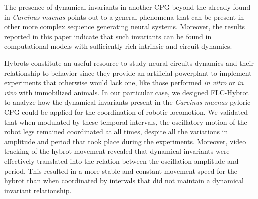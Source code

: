 
The presence of dynamical invariants in another CPG beyond the already found in \textit{Carcinus maenas} \cite{elices_robust_2019} points out to a general phenomena that can be present in other more complex sequence generating neural systems. Moreover, the results reported in this paper indicate that such invariants can be found in computational models with sufficiently rich intrinsic and circuit dynamics.







Hybrots constitute an useful resource to study neural circuits dynamics and their relationship to behavior since they provide an artificial powerplant to implement experiments that otherwise would lack one, like those performed \textit{in vitro} or \textit{in vivo} with immobilized animals. In our particular case, we designed FLC-Hybrot to analyze how the dynamical invariants present in the \textit{Carcinus maenas} pyloric CPG could be applied for the coordination of robotic locomotion. We validated that when modulated by these temporal intervals, the oscillatory motion of the robot legs remained coordinated at all times, despite all the variations in amplitude and period that took place during the experiments. Moreover, video tracking of the hybrot movement revealed that dynamical invariants were effectively translated into the relation between the oscillation amplitude and period. This resulted in a more stable and constant movement speed for the hybrot than when coordinated by intervals that did not maintain a dynamical invariant relationship.

